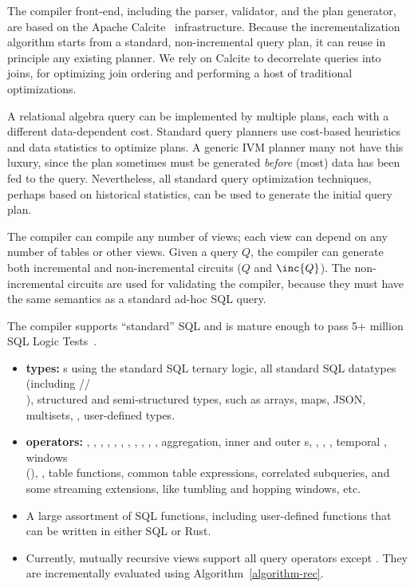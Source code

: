 The compiler front-end, including the parser, validator, and the plan
generator, are based on the Apache Calcite~\cite{begoli-icmd18}
infrastructure.  Because the incrementalization algorithm starts from
a standard, non-incremental query plan, it can reuse in principle any
existing planner.  We rely on Calcite to decorrelate queries into
joins, for optimizing join ordering and performing a host of
traditional optimizations.

A relational algebra query can be implemented by multiple plans, each
with a different data-dependent cost.  Standard query planners use
cost-based heuristics and data statistics to optimize plans.  A
generic IVM planner many not have this luxury, since the plan
sometimes must be generated \emph{before} (most) data has been fed
to the query.  Nevertheless, all standard query optimization
techniques, perhaps based on historical statistics, can be used to
generate the initial query plan.

The compiler can compile any number of views; each view can depend on
any number of tables or other views.  Given a query $Q$, the compiler
can generate both incremental and non-incremental circuits ($Q$ and
$\inc{Q}$).  The non-incremental circuits are used for validating the
compiler, because they must have the same semantics as a standard
ad-hoc SQL query.

The compiler supports ``standard'' SQL and is mature enough to pass
5+ million SQL Logic Tests~\cite{sqllogictest}.
\begin{itemize}
\item \textbf{types:} s using the standard SQL ternary
  logic, all standard SQL datatypes (including
  //\\), structured and
  semi-structured types, such as arrays, maps, JSON, multisets,
  , user-defined types.
\item \textbf{operators:} , , ,
  ,  , ,
  , , , ,
  , aggregation, inner and outer s,
  , , , temporal ,
  windows \\ (), , table
  functions, common table expressions, correlated subqueries, and some
  streaming extensions, like tumbling and hopping windows, etc.
\item A large assortment of SQL functions, including user-defined
  functions that can be written in either SQL or Rust.
\item Currently, mutually recursive views support all query operators
  except .  They are incrementally evaluated using
  Algorithm~\ref{algorithm-rec}.
\end{itemize}

